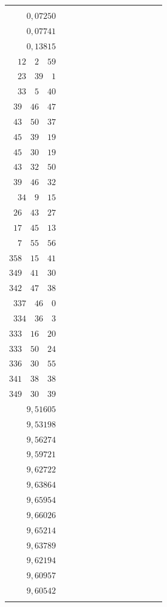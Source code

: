 \begin{landscape}
\begin{center}
\begin{tabular}{r|r|r|r|r|r|r|r|r|r|r|r|r}
{\(0{,}12496\) \\
\(0{,}07250\) \\
\(0{,}07741\) \\
\(0{,}13815\)
}
&
\GaussVIIcolumn{
\(0^0\quad 1'\quad 2''\) \\
\(12\quad 2\quad 59\) \\
\(23\quad 39\quad 1\) \\
\(33\quad 5\quad 40\) \\[3pt]
\(39\quad 46\quad 47\) \\
\(43\quad 50\quad 37\) \\
\(45\quad 39\quad 19\) \\
\(45\quad 30\quad 19\) \\[3pt]
\(43\quad 32\quad 50\) \\
\(39\quad 46\quad 32\) \\
\(34\quad 9\quad 15\) \\
\(26\quad 43\quad 27\) \\[3pt]
\(17\quad 45\quad 13\) \\
\(7\quad 55\quad 56\) \\
\(358\quad 15\quad 41\) \\
\(349\quad 41\quad 30\) \\[3pt]
\(342\quad 47\quad 38\) \\
\(337\quad 46\quad 0\) \\
\(334\quad 36\quad 3\) \\
\(333\quad 16\quad 20\) \\[3pt]
\(333\quad 50\quad 24\) \\
\(336\quad 30\quad 55\) \\
\(341\quad 38\quad 38\) \\
\(349\quad 30\quad 39\)
}
&
\GaussVIIcolumn{
\(9{,}52192\) \\
\(9{,}51605\) \\
\(9{,}53198\) \\
\(9{,}56274\) \\[3pt]
\(9{,}59721\) \\
\(9{,}62722\) \\
\(9{,}63864\) \\
\(9{,}65954\) \\[3pt]
\(9{,}66026\) \\
\(9{,}65214\) \\
\(9{,}63789\) \\
\(9{,}62194\) \\[3pt]
\(9{,}60957\) \\
\(9{,}60542\) \\
}
\end{tabular}
\end{center}
\end{landscape}
